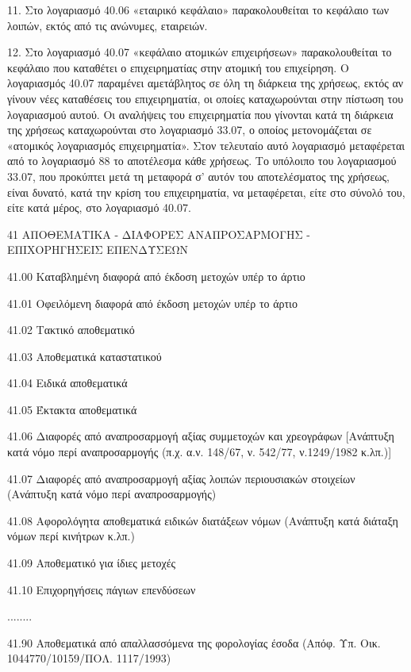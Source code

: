 \documentclass[A4,10pt,greek]{book}
\begin{document}
11. Στο λογαριασμό 40.06 «εταιρικό κεφάλαιο» παρακολουθείται το κεφάλαιο των λοιπών, εκτός από τις ανώνυμες, εταιρειών.

12. Στο λογαριασμό 40.07 «κεφάλαιο ατομικών επιχειρήσεων» παρακολουθείται το κεφάλαιο που καταθέτει ο επιχειρηματίας στην ατομική του επιχείρηση. Ο λογαριασμός 40.07 παραμένει αμετάβλητος σε όλη τη διάρκεια της χρήσεως, εκτός αν γίνουν νέες καταθέσεις του επιχειρηματία, οι οποίες καταχωρούνται στην πίστωση του λογαριασμού αυτού. Οι αναλήψεις του επιχειρηματία που γίνονται κατά τη διάρκεια της χρήσεως καταχωρούνται στο λογαριασμό 33.07, ο οποίος μετονομάζεται σε «ατομικός λογαριασμός επιχειρηματία». Στον τελευταίο αυτό λογαριασμό μεταφέρεται από το λογαριασμό 88 το αποτέλεσμα κάθε χρήσεως. Το υπόλοιπο του λογαριασμού 33.07, που προκύπτει μετά τη μεταφορά σ' αυτόν του αποτελέσματος της χρήσεως, είναι δυνατό, κατά την κρίση του επιχειρηματία, να μεταφέρεται, είτε στο σύνολό του, είτε κατά μέρος, στο λογαριασμό 40.07.

 41   ΑΠΟΘΕΜΑΤΙΚΑ - ΔΙΑΦΟΡΕΣ ΑΝΑΠΡΟΣΑΡΜΟΓΗΣ - ΕΠΙΧΟΡΗΓΗΣΕΙΣ ΕΠΕΝΔΥΣΕΩΝ

        41.00   Καταβλημένη διαφορά από έκδοση μετοχών υπέρ το άρτιο 

        41.01   Οφειλόμενη διαφορά από έκδοση μετοχών υπέρ το άρτιο 

        41.02   Τακτικό αποθεματικό

        41.03   Αποθεματικά καταστατικού 

        41.04   Ειδικά αποθεματικά 

        41.05   Έκτακτα αποθεματικά 

        41.06   Διαφορές από αναπροσαρμογή αξίας συμμετοχών και χρεογράφων
                    [Ανάπτυξη κατά νόμο περί αναπροσαρμογής
                    (π.χ. α.ν. 148/67, ν. 542/77, ν.1249/1982 κ.λπ.)]

        41.07   Διαφορές από αναπροσαρμογή αξίας λοιπών περιουσιακών στοιχείων
                    (Ανάπτυξη κατά νόμο περί αναπροσαρμογής)

        41.08   Αφορολόγητα αποθεματικά ειδικών διατάξεων νόμων
                    (Ανάπτυξη κατά διάταξη νόμων περί κινήτρων κ.λπ.)

        41.09   Αποθεματικό για ίδιες μετοχές 

        41.10   Επιχορηγήσεις πάγιων επενδύσεων 

        ........

        41.90   Αποθεματικά από απαλλασσόμενα της φορολογίας έσοδα
                    (Απόφ. Υπ. Οικ. 1044770/10159/ΠΟΛ. 1117/1993)
\end{document}
